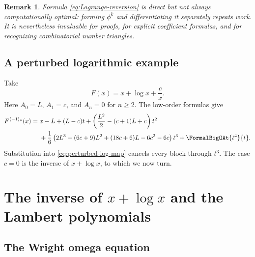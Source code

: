 \documentclass[11pt]{article}
\theoremstyle{pltheorem}
\newtheorem{remark}[theorem]{Remark}
\newcommand{\rev}{\langle-1\rangle_{\circ}}
\begin{document}
\begin{remark}
Formula \cref{eq:Lagrange-reversion} is direct but not always computationally optimal: forming \(\phi^k\) and differentiating it separately repeats work.  It is nevertheless invaluable for proofs, for explicit coefficient formulas, and for recognizing combinatorial number triangles.
\end{remark}

\subsection{A perturbed logarithmic example}

Take
\begin{equation}\label{eq:perturbed-log-map}
 F(x)=x+\log x+\frac{c}{x}.
\end{equation}
Here \(A_0=L\), \(A_1=c\), and \(A_n=0\) for \(n\ge2\).  The low-order formulas give
\begin{align}
 F^{\rev}(x)={}&x-L+(L-c)t
 +\left(\frac{L^2}{2}-(c+1)L+c\right)t^2
 \notag\\
 &+\frac{1}{6}\left(2L^3-(6c+9)L^2+(18c+6)L-6c^2-6c\right)t^3
 +\FormalBigOAt{t^4}{t}.
 \label{eq:perturbed-log-inverse}
\end{align}
Substitution into \cref{eq:perturbed-log-map} cancels every block through \(t^3\).  The case \(c=0\) is the inverse of \(x+\log x\), to which we now turn.

\section{\texorpdfstring{The inverse of \(x+\log x\) and the Lambert polynomials}{The inverse of x + log x and the Lambert polynomials}}
\label{sec:Lambert-polynomials}

\subsection{The Wright omega equation}
\end{document}

